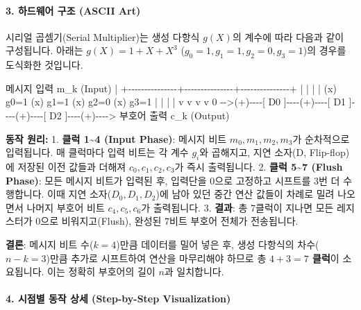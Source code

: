 \documentclass[
  oneside]{article}
\newenvironment{Shaded}{}{}
\newcommand{\NormalTok}[1]{#1}
\begin{document}
\paragraph{3. 하드웨어 구조 (ASCII
Art)}\label{uxd558uxb4dcuxc6e8uxc5b4-uxad6cuxc870-ascii-art}

시리얼 곱셈기(Serial Multiplier)는 생성 다항식 \(g(X)\)의 계수에 따라
다음과 같이 구성됩니다. 아래는 \(g(X) = 1 + X + X^3\)
(\(g_0=1, g_1=1, g_2=0, g_3=1\))의 경우를 도식화한 것입니다.

\begin{Shaded}
\begin{Highlighting}[]
\NormalTok{       메시지 입력 m\_k (Input)}
\NormalTok{        |}
\NormalTok{        +{-}{-}{-}{-}{-}{-}{-}{-}{-}{-}{-}{-}{-}{-}{-}+{-}{-}{-}{-}{-}{-}{-}{-}{-}{-}{-}{-}{-}{-}{-}+{-}{-}{-}{-}{-}{-}{-}{-}{-}{-}{-}{-}{-}{-}{-}+}
\NormalTok{        |               |               |               |}
\NormalTok{       (x) g0=1        (x) g1=1        (x) g2=0        (x) g3=1}
\NormalTok{        |               |               |               |}
\NormalTok{        v               v               v               v}
\NormalTok{ 0 {-}{-}\textgreater{}(+){-}{-}{-}{-}[ D0 ]{-}{-}{-}{-}(+){-}{-}{-}{-}[ D1 ]{-}{-}{-}{-}(+){-}{-}{-}{-}[ D2 ]{-}{-}{-}{-}(+){-}{-}{-}{-}\textgreater{} 부호어 출력 c\_k (Output)}
\end{Highlighting}
\end{Shaded}

\textbf{동작 원리:} 1. \textbf{클럭 1\textasciitilde4 (Input Phase)}:
메시지 비트 \(m_0, m_1, m_2, m_3\)가 순차적으로 입력됩니다. 매 클럭마다
입력 비트는 각 계수 \(g_i\)와 곱해지고, 지연 소자(D, Flip-flop)에 저장된
이전 값들과 더해져 \(c_0, c_1, c_2, c_3\)가 즉시 출력됩니다. 2.
\textbf{클럭 5\textasciitilde7 (Flush Phase)}: 모든 메시지 비트가 입력된
후, 입력단을 0으로 고정하고 시프트를 3번 더 수행합니다. 이때 지연
소자(\(D_0, D_1, D_2\))에 남아 있던 중간 연산 값들이 차례로 밀려
나오면서 나머지 부호어 비트 \(c_4, c_5, c_6\)가 출력됩니다. 3.
\textbf{결과}: 총 7클럭이 지나면 모든 레지스터가 0으로 비워지고(Flush),
완성된 7비트 부호어 전체가 전송됩니다.

\textbf{결론}: 메시지 비트 수(\(k=4\))만큼 데이터를 밀어 넣은 후, 생성
다항식의 차수(\(n-k=3\))만큼 추가로 시프트하여 연산을 마무리해야 하므로
총 \textbf{\(4 + 3 = 7\) 클럭}이 소요됩니다. 이는 정확히 부호어의 길이
\textbf{\(n\)}과 일치합니다.

\paragraph{4. 시점별 동작 상세 (Step-by-Step
Visualization)}\label{uxc2dcuxc810uxbcc4-uxb3d9uxc791-uxc0c1uxc138-step-by-step-visualization}
\end{document}
